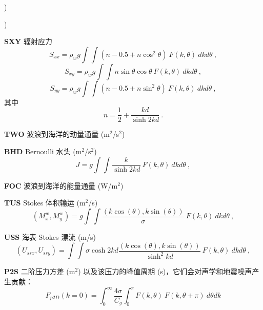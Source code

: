 \begin{list}{)\hfill}
\begin{list}{)\hfill}
            { \leftmargin 8mm 
             \rightmargin 0mm \itemsep 0mm \parsep 0mm}
\item \textbf{SXY} 辐射应力
      \begin{equation} S_{xx} = \rho_w g \int \!\!\!\! \int \left
        ( n - 0.5 + n \cos^2 \theta \right )  \: F(k,\theta) \: dk d\theta
      \: , \label{eq:Sxx} \end{equation}
      \begin{equation} S_{xy} =\rho_w g \int \!\!\!\! \int
        n \sin \theta \cos \theta  \: F(k,\theta) \: dk d\theta
      \: , \label{eq:Syy} \end{equation}
      \begin{equation} S_{yy} =\rho_w g \int \!\!\!\! \int \left
        ( n - 0.5 + n \sin^2 \theta \right )  \: F(k,\theta) \: dk d\theta
      \: , \label{eq:Sxy} \end{equation}
      其中
      \begin{equation} n = \frac{1}{2} + \frac{kd}{\sinh 2kd}
      \: . \label{eq:n} \end{equation}
\item \textbf{TWO} 波浪到海洋的动量通量 (m$^2$/s$^2$)
\item \textbf{BHD} Bernoulli 水头 (m$^2$/s$^2$)
      \begin{equation} J =  g \int \!\!\!\! \int  \frac{k}
        {\sinh 2kd}  \: F(k,\theta) \: dk d\theta
      \: , \label{eq:BHD} \end{equation}
\item \textbf{FOC} 波浪到海洋的能量通量 (W/m$^2$)
\item \textbf{TUS} Stokes 体积输运 (m$^2$/s)
     \begin{equation} (M^w_x,M^w_y) =  g \int \!\!\!\! \int  \frac{(k \cos(\theta),k \sin(\theta))}
        {\sigma}  \: F(k,\theta) \: dk d\theta
      \: , \label{eq:Mw} \end{equation}
\item \textbf{USS} 海表 Stokes 漂流 (m/s)
     \begin{equation} (U_{ssx},U_{ssy}) =  \int \!\!\!\! \int  \sigma \cosh 2kd \frac{(k \cos(\theta),k \sin(\theta))}
        {\sinh^2 kd}  \: F(k,\theta) \: dk d\theta
      \: , \label{eq:Uss} \end{equation}
\item \textbf{P2S} 二阶压力方差 (m$^2$) 以及该压力的峰值周期 (s)，它们会对声学和地震噪声产生贡献：
      \begin{equation} F_{p2D}(k=0) = \int_0^{\infty} \frac{4 \sigma}{C_g} \int_0^{\pi}  F(k,\theta) \:  F(k,\theta+\pi) \:  d\theta dk

\end{equation}
\end{list}
\end{list}
